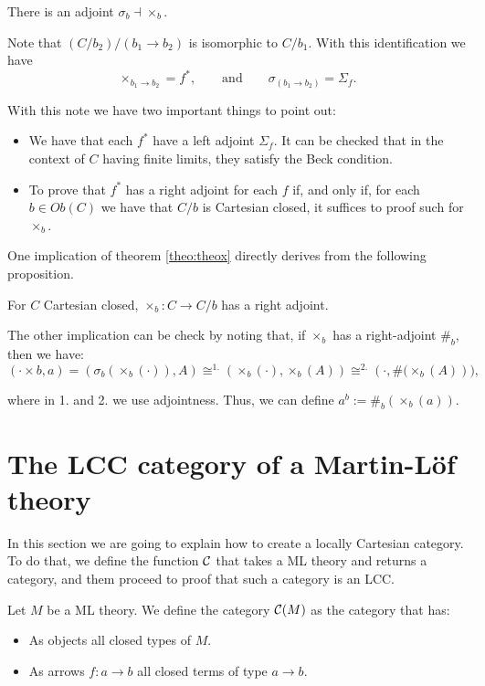 \begin{proposition}
There is an adjoint  $\sigma_b \dashv \times_b$.\\
\end{proposition}

Note that $(C/b_2)/(b_1\to b_2)$ is isomorphic to $C/b_1$. With this identification we have $$\times_{b_1\to b_2} = f^*,\qquad \text{and} \qquad\sigma_{(b_1\to b_2)} = \Sigma_f.$$

With this note we have two important things to point out:
\begin{itemize}
\item We have that each $f^*$ have a left adjoint $\Sigma_f$. It can be checked that in the context of $C$ having finite limits, they satisfy the Beck condition. 
\item To prove that $f^*$ has a right adjoint for each $f$ if, and only if, for each $b\in Ob(C)$ we have that $C/b$ is Cartesian closed, it suffices to proof such for $\times_b$.\\
\end{itemize}

One implication of theorem \ref{theo:theox} directly derives from the following proposition.
\begin{proposition}
  For $C$ Cartesian closed, $\times_b: C\to C/b$ has a right adjoint.
\end{proposition}

The other implication can be check by noting that, if $\times_b$ has a right-adjoint $\#_b$, then we have:
$$(\cdot \times b, a) = \left( \sigma_b(\times_b(\cdot)), A\right) \cong^{1.} \left( \times_b(\cdot), \times_b(A)\right)  \cong^{2.} \left( \cdot, \#(\times_b(A)\right)), $$

where in 1. and 2. we use adjointness. Thus, we can define $a^b:= \#_b(\times_b(a))$.


\section{The LCC category of a Martin-L\"of theory}
\label{InternalLCC}
In this section we are going to explain how to create a locally Cartesian category. To do that, we define the function $\mathcal{C}$ that takes a ML theory and returns a category, and them proceed to proof that such a category is an LCC.

\begin{definition}
  Let $M$ be a ML theory. We define the category $\mathcal{C}(M)$ as the category that has:
  \begin{itemize}
  \item As objects all closed types of $M$.
  \item As arrows $f:a\to b$  all closed terms of type $a\to b$.
  \end{itemize}
\end{definition}

